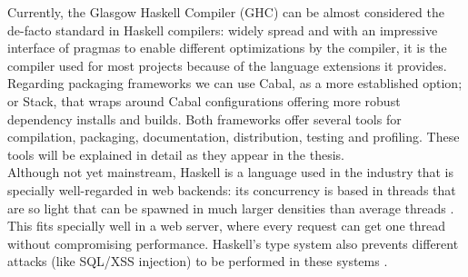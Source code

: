 Currently, the Glasgow Haskell Compiler (GHC) can be almost considered the
de-facto standard in Haskell compilers: widely spread and with an impressive
interface of pragmas to enable different optimizations by the compiler, it is
the compiler used for most projects because of the language extensions it
provides. Regarding packaging frameworks we can use Cabal, as a more
established option; or Stack, that wraps around Cabal configurations offering
more robust dependency installs and builds. Both frameworks offer several tools
for compilation, packaging, documentation, distribution, testing and profiling.
These tools will be explained in detail as they appear in the thesis.\\

Although not yet mainstream, Haskell is a language used in the industry that is
specially well-regarded in web backends: its concurrency is based in threads
that are so light that can be spawned in much larger densities than average
threads \cite{epstein-2011-cloud}. This fits specially well in a web server,
where every request can get one thread without compromising performance.
Haskell's type system also prevents different attacks (like SQL/XSS injection)
to be performed in these systems \cite{snoyman-2015-yesod}.

\newpage

